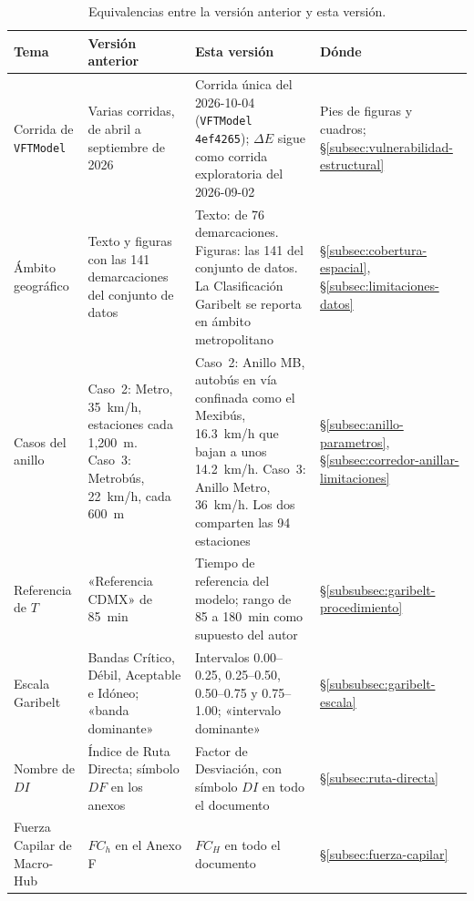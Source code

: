 \begin{table}[H]
\centering
\caption[Equivalencias entre versiones]{Equivalencias entre la versión
anterior y esta versión.}
\label{tab:nota-version}
\small
\begin{tabularx}{\textwidth}{>{\raggedright\arraybackslash}p{2.3cm}
  >{\raggedright\arraybackslash}X >{\raggedright\arraybackslash}X
  >{\raggedright\arraybackslash}p{2.1cm}}
\toprule
\textbf{Tema} & \textbf{Versión anterior} & \textbf{Esta versión} &
\textbf{Dónde} \\
\midrule
Corrida de \texttt{VFTModel}
  & Varias corridas, de abril a septiembre de 2026
  & Corrida única del 2026-10-04 (\texttt{VFTModel} \texttt{4ef4265}); $\Delta E$
    sigue como corrida exploratoria del 2026-09-02
  & Pies de figuras y cuadros; §\ref{subsec:vulnerabilidad-estructural} \\
Ámbito geográfico
  & Texto y figuras con las 141 demarcaciones del conjunto de datos
  & Texto: \zmvm{} de 76 demarcaciones. Figuras: las 141 del conjunto de
    datos. La Clasificación Garibelt se reporta en ámbito metropolitano
  & §\ref{subsec:cobertura-espacial}, §\ref{subsec:limitaciones-datos} \\
Casos del anillo
  & Caso~2: Metro, 35~km/h, estaciones cada 1,200~m. Caso~3: Metrobús,
    22~km/h, cada 600~m
  & Caso~2: Anillo MB, autobús en vía confinada como el Mexibús, 16.3~km/h que bajan
    a unos 14.2~km/h. Caso~3: Anillo Metro, 36~km/h. Los dos comparten las 94
    estaciones
  & §\ref{subsec:anillo-parametros}, §\ref{subsec:corredor-anillar-limitaciones} \\
Referencia de $T$
  & «Referencia CDMX» de 85~min
  & Tiempo de referencia del modelo; rango de 85 a 180~min como supuesto del
    autor
  & §\ref{subsubsec:garibelt-procedimiento} \\
Escala Garibelt
  & Bandas Crítico, Débil, Aceptable e Idóneo; «banda dominante»
  & Intervalos 0.00--0.25, 0.25--0.50, 0.50--0.75 y 0.75--1.00; «intervalo
    dominante»
  & §\ref{subsubsec:garibelt-escala} \\
Nombre de $DI$
  & Índice de Ruta Directa; símbolo $DF$ en los anexos
  & Factor de Desviación, con símbolo $DI$ en todo el documento
  & §\ref{subsec:ruta-directa} \\
Fuerza Capilar de Macro-Hub
  & $FC_h$ en el Anexo F
  & $FC_H$ en todo el documento
  & §\ref{subsec:fuerza-capilar} \\
\bottomrule
\end{tabularx}
\end{table}

